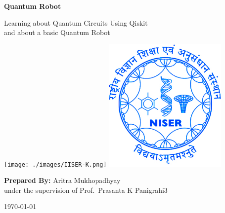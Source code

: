 \begin{titlepage}
    \begin{center}
        \vspace*{1cm}

        \textbf{\Huge Quantum Robot}

        \vspace{1cm}
        {\Large Learning about Quantum Circuits Using Qiskit\\
        and about a basic Quantum Robot}
        \vfill

        \texttt{[image: ./images/IISER-K.png]}
        \includegraphics[width=6cm]{./images/NISER.jpg}
        \vfill

        \textbf{\large Prepared By:} Aritra Mukhopadhyay\\
        under the supervision of Prof.\ Prasanta K Panigrahi3
        \vfill


        \today

    \end{center}
\end{titlepage}